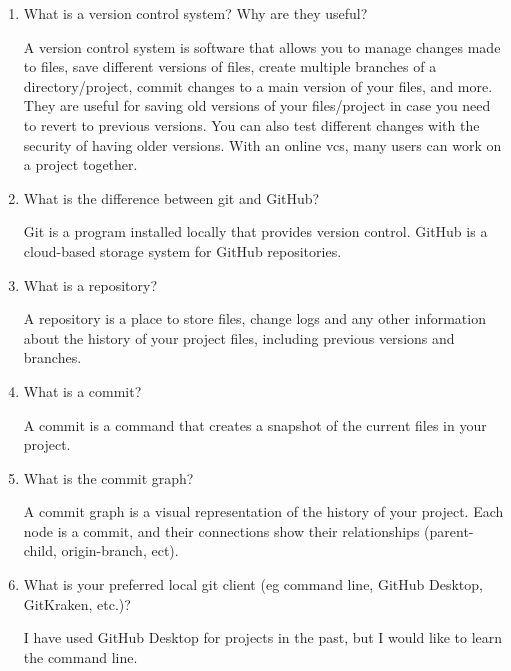 \documentclass[10pt,twocolumn]{article}
\begin{document}
\begin{enumerate}
    \item What is a version control system? Why are they useful?\newline
    \par A version control system is software that allows you to manage changes made to files, save different versions of files, create multiple branches of a directory/project, commit changes to a main version of your files, and more. They are useful for saving old versions of your files/project in case you need to revert to previous versions. You can also test different changes with the security of having older versions. With an online vcs, many users can work on a project together.\newline
    \item What is the difference between git and GitHub?\newline
    \par Git is a program installed locally that provides version control. GitHub is a cloud-based storage system for GitHub repositories. \newline
    \item What is a repository?\newline
    \par A repository is a place to store files, change logs and any other information about the history of your project files, including previous versions and branches. \newline
    \item What is a commit?\newline
    \par A commit is a command that creates a snapshot of the current files in your project. \newline
    \item What is the commit graph?\newline
    \par A commit graph is a visual representation of the history of your project. Each node is a commit, and their connections show their relationships (parent-child, origin-branch, ect).\newline
    \item What is your preferred local git client (eg command line, GitHub Desktop, GitKraken, etc.)?\newline
    \par I have used GitHub Desktop for projects in the past, but I would like to learn the command line. \newline
\end{enumerate}
\end{document}

